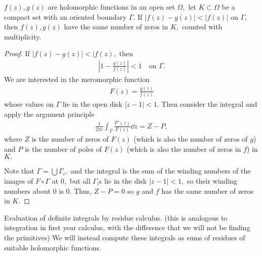 \documentclass[a4paper,12pt]{article}
\begin{document}
\begin{theorem}[Rouche's]
    $f(z),g(z)$ are holomorphic functions in an open set $\Omega,$ let $K\subset\Omega$ be a compact set with an oriented boundary $\Gamma.$ If $|f(z)-g(z)|<|f(z)|$ on $\Gamma,$ then $f(z),g(z)$ have the same number of zeros in $K,$ counted with multiplicity.
    \begin{proof}
        If $|f(z)-g(z)|<|f(z),$ then \begin{align}
            \left|1-\frac{g(z)}{f(z)}\right|<1\quad\text{on }\Gamma.
        \end{align}
        We are interested in the meromorphic function \begin{align}
            F(z)=\frac{g(z)}{f(z)}
        \end{align}
        whose values on $\Gamma$ lie in the open disk $|z-1|<1.$ Then consider the integral and apply the argument principle \begin{align}
            \frac{1}{2\pi i}\int_\Gamma\frac{F'(z)}{F(z)}\dd z=Z-P,
        \end{align}
        where $Z$ is the number of zeros of $F(z)$ (which is also the number of zeros of $g$) and $P$ is the number of poles of $F(z)$ (which is also the number of zeros in $f$) in $K.$

        Note that $\Gamma=\bigcup\Gamma_i,$ and the integral is the sum of the winding numbers of the images of $F\circ\Gamma$ at $0,$ but all $\Gamma_i$s lie in the disk $|z-1|<1,$ so their winding numbers about $0$ is $0.$ Thus, $Z-P=0$ so $g$ and $f$ has the same number of zeros in $K.$
    \end{proof}
\end{theorem}

Evaluation of definite integrals by residue calculus. (this is analogous to integration in first year calculus, with the difference that we will not be finding the primitives) We will instead compute these integrals as sums of residues of suitable holomorphic functions.
\end{document}

